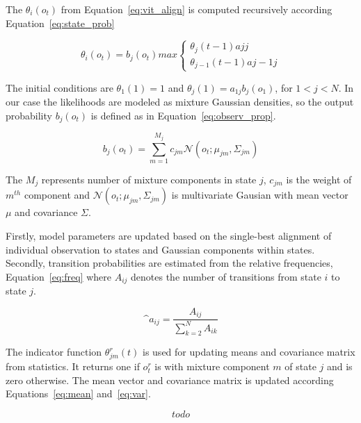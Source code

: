 {

The $\theta_i(o_t)$ from Equation~\ref{eq:vit_align} is computed recursively according Equation~\ref{eq:state_prob}

\begin{equation}\label{eq:state_prob}
    \theta_i(o_t) = b_j(o_t) max \left\{
  \begin{array}{lr}
      \theta_j(t-1)a{jj}\\
      \theta_{j-1}(t-1)a{j-1j}
  \end{array}
\right.
\end{equation}

The initial conditions are $\theta_1(1)=1$ and $\theta_j(1)= a_{1j}b_j(o_1)$, for $ 1 < j < N$.
In our case the likelihoods are modeled as mixture Gaussian densities, so the output probability $b_j(o_t)$ is defined as in Equation~\ref{eq:observ_prop}.

\begin{equation}\label{eq:observ_prob}
    b_j(o_t) = \sum_{m=1}^{M_j}{c_{jm}\mathcal{N}(o_t; \mu_{jm}, \Sigma_{jm})}
\end{equation}

The $M_j$ represents number of mixture components in state $j$, $c_{jm}$ is the weight of $m^{th}$ component and $\mathcal{N}(o_t; \mu_{jm}, \Sigma_{jm})$
is multivariate Gausian with mean vector $\mu$ and covariance $\Sigma$.

Firstly, model parameters are updated based on the single-best alignment of individual observation to states and Gaussian components within states.
Secondly, transition probabilities are estimated from the relative frequencies, Equation~\ref{eq:freq} where $A_{ij}$ denotes the number of transitions from state $i$ to state $j$.

\begin{equation}\label{eq:freq}
    \^{a}_{ij} = \frac{A_{ij}}{\sum_{k=2}^{N}{A_{ik}}}
\end{equation}

The indicator function $\theta^r_{jm}(t)$ is used for updating means and covariance matrix from statistics.
It returns one if $o^r_t$ is  with mixture component $m$ of state $j$ and is zero otherwise.
The mean vector and covariance matrix is updated according Equations~\ref{eq:mean} and~\ref{eq:var}.

\begin{equation}\label{eq:mean}
    todo
\end{equation}

}
